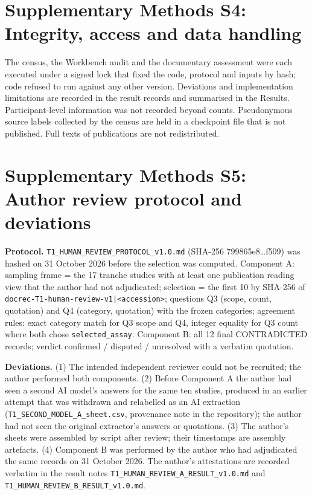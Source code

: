 \documentclass[sn-basic]{sn-jnl}
\begin{document}
\FloatBarrier
\section*{Supplementary Methods S4: Integrity, access and data handling}


The census, the Workbench audit and the documentary assessment were each executed under a signed lock that fixed the
code, protocol and inputs by hash; code refused to run against any other version. Deviations and implementation
limitations are recorded in the result records and summarised in the Results. Participant-level information was
not recorded beyond counts. Pseudonymous source labels collected by the census are held in a checkpoint file that is
not published. Full texts of publications are not redistributed.



\section*{Supplementary Methods S5: Author review protocol and deviations}
\textbf{Protocol.} \texttt{T1\_HUMAN\_REVIEW\_PROTOCOL\_v1.0.md} (SHA-256 799865e8\ldots f509) was hashed on 31 October 2026 before the selection was computed. Component A: sampling frame = the 17 tranche studies with at least one publication reading view that the author had not adjudicated; selection = the first 10 by SHA-256 of \texttt{docrec-T1-human-review-v1|<accession>}; questions Q3 (scope, count, quotation) and Q4 (category, quotation) with the frozen categories; agreement rules: exact category match for Q3 scope and Q4, integer equality for Q3 count where both chose \texttt{selected\_assay}. Component B: all 12 final CONTRADICTED records; verdict confirmed / disputed / unresolved with a verbatim quotation.

\textbf{Deviations.} (1) The intended independent reviewer could not be recruited; the author performed both components. (2) Before Component A the author had seen a second AI model's answers for the same ten studies, produced in an earlier attempt that was withdrawn and relabelled as an AI extraction (\texttt{T1\_SECOND\_MODEL\_A\_sheet.csv}, provenance note in the repository); the author had not seen the original extractor's answers or quotations. (3) The author's sheets were assembled by script after review; their timestamps are assembly artefacts. (4) Component B was performed by the author who had adjudicated the same records on 31 October 2026. The author's attestations are recorded verbatim in the result notes \texttt{T1\_HUMAN\_REVIEW\_A\_RESULT\_v1.0.md} and \texttt{T1\_HUMAN\_REVIEW\_B\_RESULT\_v1.0.md}.
\end{document}
